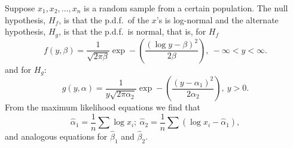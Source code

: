 \documentclass[draft]{article}
\begin{document}
Suppose \(x_1, x_2, \ldots, x_n\) is a random sample from a certain
population. The null hypothesis, \(H_f\), is that the p.d.f.\ of the
\(x\)'s is log-normal and the alternate hypothesis, \(H_g\), is
that the p.d.f.\ is normal, that is, for \(H_f\)
\begin{equation}
f\left(y,\beta\right) = \frac{1}{\sqrt{2\pi\beta}}
\exp-\left(\frac{\left(\log y-\beta\right)^2}{2\beta}\right),
\: -\infty < y< \infty.
\end{equation}
and for \(H_g\):
\begin{equation}
g\left(y,\alpha\right) = \frac{1}{y\sqrt{2\pi\alpha_2}}
\exp-\left(\frac{\left(y-\alpha_1\right)^2}{2\alpha_2}\right),
\: y>0.
\end{equation}
From the maximum likelihood equations we find that
\begin{equation}
\hat{\alpha}_1=\frac{1}{n}\sum\log x_i; \:
\hat{\alpha}_2=\frac{1}{n}\sum\left(\log x_i-\hat{\alpha}_1\right),
\end{equation}
and analogous equations for \(\hat{\beta}_1\) 
and \(\hat{\beta}_2\).
\end{document}
